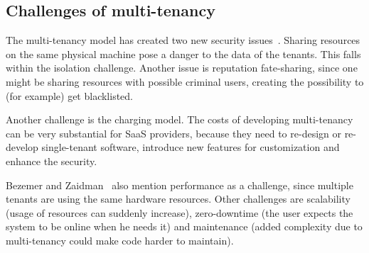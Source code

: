 \subsection{Challenges of multi-tenancy} %

The multi-tenancy model has created two new security issues~\cite{dillon2010cloud}. Sharing resources on the same physical machine pose a danger to the data of the tenants. This falls within the isolation challenge. Another issue is reputation fate-sharing, since one might be sharing resources with possible criminal users, creating the possibility to (for example) get blacklisted.

Another challenge is the charging model. The costs of developing multi-tenancy can be very substantial for \ac{SaaS} providers, because they need to re-design or re-develop single-tenant software, introduce new features for customization and enhance the security. %

Bezemer and Zaidman~\cite{bezemer2010multi} also mention performance as a challenge, since multiple tenants are using the same hardware resources. Other challenges are scalability (usage of resources can suddenly increase), zero-downtime (the user expects the system to be online when he needs it) and maintenance (added complexity due to multi-tenancy could make code harder to maintain).
